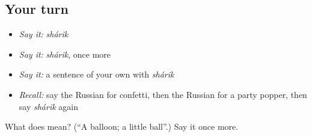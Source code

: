 \subsection*{Your turn}
\begin{itemize}
\raggedright
  \item \emph{Say it:} \emph{shárik}
  \item \emph{Say it:} \emph{shárik}, once more
  \item \emph{Say it:} a sentence of your own with \emph{shárik}
  \item \emph{Recall:} say the Russian for confetti, then the Russian for a party popper, then say \emph{shárik} again
\end{itemize}

\begin{tcolorbox}[breakable,colback=teal!4,colframe=teal!35!black,title={Before you move on}]
What does  mean? (\textquotedblleft{}A balloon; a little ball\textquotedblright{}.) Say it once more.
\end{tcolorbox}
